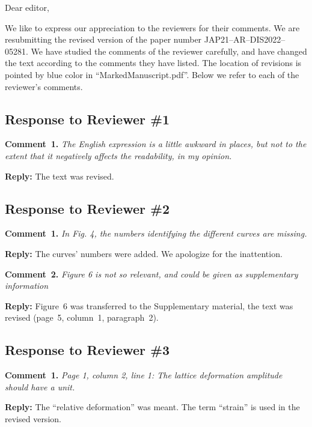 \documentclass[aip,jap,preprint]{revtex4-1}
\begin{document}
Dear editor,

We like to express our appreciation to the reviewers for their comments.
We are resubmitting the revised version of the paper number JAP21--AR--DIS2022--05281.
We have studied the comments of the reviewer carefully, and have changed the text according to the comments they
have listed.
The location of revisions is pointed by blue color in ``MarkedManuscript.pdf''.
Below we refer to each of the reviewer’s comments.


\subsection*{Response to Reviewer \#1 }

\noindent
\textcolor[rgb]{0.00,0.50,1.00}{\textbf{Comment~1.}}
\emph{The English expression is a little awkward in places, but not to the extent that it negatively affects the readability, in my opinion.}

\noindent
\textcolor[rgb]{0.51,0.00,0.00}{\textbf{Reply:}}
The text was revised.


\subsection*{Response to Reviewer \#2 }

\noindent
\textcolor[rgb]{0.00,0.50,1.00}{\textbf{Comment~1.}}
\emph{In Fig. 4, the numbers identifying the different curves are missing.}

\noindent
\textcolor[rgb]{0.51,0.00,0.00}{\textbf{Reply:}}
The curves' numbers were added.
We apologize for the inattention.


\vspace{1cm}
\noindent
\textcolor[rgb]{0.00,0.50,1.00}{\textbf{Comment~2.}}
\emph{Figure 6 is not so relevant, and could be given as supplementary information}

\noindent
\textcolor[rgb]{0.51,0.00,0.00}{\textbf{Reply:}}
Figure~6 was transferred to the Supplementary material,
the text was revised (page~5, column~1, paragraph~2).


\subsection*{Response to Reviewer \#3 }

\noindent
\textcolor[rgb]{0.00,0.50,1.00}{\textbf{Comment~1.}}
\emph{Page 1, column 2, line 1: The lattice deformation amplitude should have a unit.}

\noindent
\textcolor[rgb]{0.51,0.00,0.00}{\textbf{Reply:}}
The ``relative deformation'' was meant.
The term ``strain'' is used in the revised version.
\end{document}
